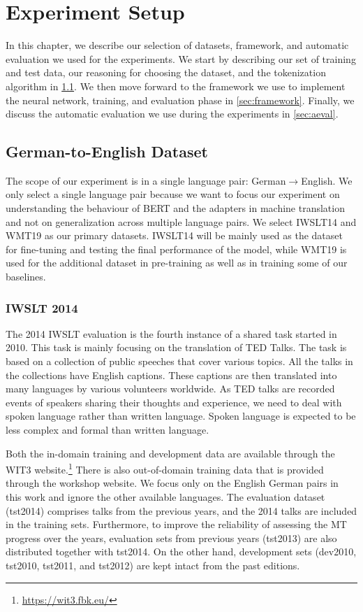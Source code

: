 
\chapter{Experiment Setup}
\label{chap:03}
In this chapter, we describe our selection of datasets, framework, and automatic evaluation we used for the experiments. We start by describing our set of training and test data, our reasoning for choosing the dataset, and the tokenization algorithm in \cref{sec:dataset}. We then move forward to the framework we use to implement the neural network, training, and evaluation phase in \cref{sec:framework}. Finally, we discuss the automatic evaluation we use during the experiments in  \cref{sec:aeval}.

\section{German-to-English Dataset}
\label{sec:dataset}
The scope of our experiment is in a single language pair: German$\rightarrow$English. We only select a single language pair because we want to focus our experiment on understanding the behaviour of BERT and the adapters in machine translation and not on generalization across multiple language pairs. We select IWSLT14 and WMT19 as our primary datasets. IWSLT14 will be mainly used as the dataset for fine-tuning and testing the final performance of the model, while WMT19 is used for the additional dataset in pre-training as well as in training some of our baselines.

\subsection{IWSLT 2014}
The 2014 IWSLT evaluation  is the fourth instance of a shared task started in 2010. This task is mainly focusing on the translation of TED Talks. The task is based on a collection of public speeches that cover various topics. All the talks in the collections have English captions. These captions are then translated into many languages by various volunteers worldwide. As TED talks are recorded events of speakers sharing their thoughts and experience, we need to deal with spoken language rather than written language. Spoken language is expected to be less complex and formal than written language.

Both the in-domain training and development data are available through the WIT3 website.\footnote{\url{https://wit3.fbk.eu/}} There is also out-of-domain training data that is provided through the workshop website. We focus only on the English German pairs in this work and ignore the other available languages. The evaluation dataset (tst2014) comprises talks from the previous years, and the 2014 talks are included in the training sets. Furthermore, to improve the reliability of assessing the MT progress over the years, evaluation sets from previous years (tst2013) are also distributed together with tst2014. On the other hand, development sets (dev2010, tst2010, tst2011, and tst2012) are kept intact from the past editions.

